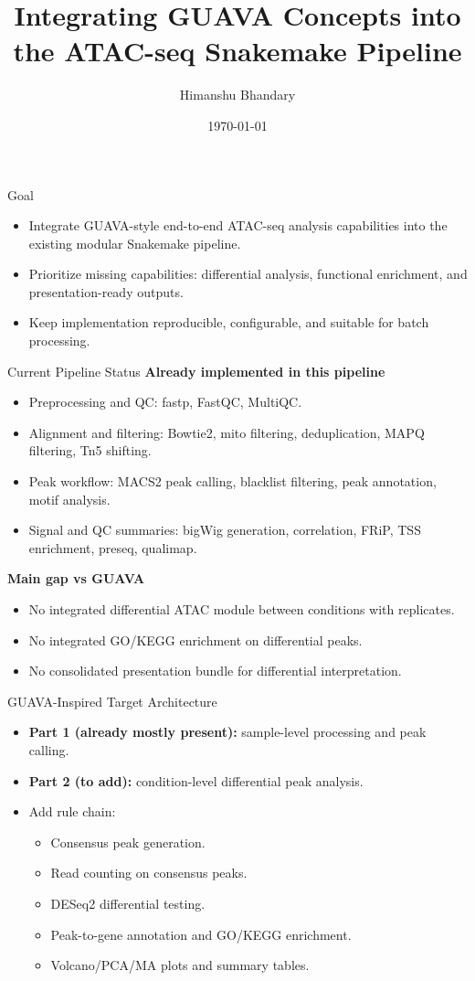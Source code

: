 \documentclass[aspectratio=169]{beamer}
\title{Integrating GUAVA Concepts into the ATAC-seq Snakemake Pipeline}
\author{Himanshu Bhandary}
\date{\today}
\begin{document}
\begin{frame}
  \titlepage
\end{frame}

\begin{frame}{Goal}
\begin{itemize}
  \item Integrate GUAVA-style end-to-end ATAC-seq analysis capabilities into the existing modular Snakemake pipeline.
  \item Prioritize missing capabilities: differential analysis, functional enrichment, and presentation-ready outputs.
  \item Keep implementation reproducible, configurable, and suitable for batch processing.
\end{itemize}
\end{frame}

\begin{frame}{Current Pipeline Status}
\textbf{Already implemented in this pipeline}
\begin{itemize}
  \item Preprocessing and QC: fastp, FastQC, MultiQC.
  \item Alignment and filtering: Bowtie2, mito filtering, deduplication, MAPQ filtering, Tn5 shifting.
  \item Peak workflow: MACS2 peak calling, blacklist filtering, peak annotation, motif analysis.
  \item Signal and QC summaries: bigWig generation, correlation, FRiP, TSS enrichment, preseq, qualimap.
\end{itemize}

\textbf{Main gap vs GUAVA}
\begin{itemize}
  \item No integrated differential ATAC module between conditions with replicates.
  \item No integrated GO/KEGG enrichment on differential peaks.
  \item No consolidated presentation bundle for differential interpretation.
\end{itemize}
\end{frame}

\begin{frame}{GUAVA-Inspired Target Architecture}
\begin{itemize}
  \item \textbf{Part 1 (already mostly present):} sample-level processing and peak calling.
  \item \textbf{Part 2 (to add):} condition-level differential peak analysis.
  \item Add rule chain:
  \begin{itemize}
    \item Consensus peak generation.
    \item Read counting on consensus peaks.
    \item DESeq2 differential testing.
    \item Peak-to-gene annotation and GO/KEGG enrichment.
    \item Volcano/PCA/MA plots and summary tables.
  \end{itemize}
\end{itemize}
\end{frame}
\end{document}
